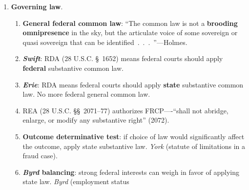 \begin{enumerate}
\begin{enumerate}
\begin{enumerate}
\begin{enumerate}
                (scope), 1391 (venue generally), 1404 (transfer), 1406 
                (dealing with improper venue). 
                \item Waivable.
                \item Transfer is available between districts.
            \end{enumerate}
            \item \textbf{\emph{Forum non conveniens}}.
            \begin{enumerate}
                \item Is there a more convenient forum where the case should 
                be adjudicated?
                \item Differences in substantive law are insufficient for FNC 
                unless the law in the target forum is egregiously bad.
                \item Successful FNC motions result in dismissal. \emph{Piper} 
                (plane crash in Scotland).
            \end{enumerate}
        \end{enumerate}
    \end{enumerate}
    \item \textbf{Governing law}.
    \begin{enumerate}
        \item \textbf{General federal common law}: ``The common law is not a 
        \textbf{brooding omnipresence} in the sky, but the articulate voice of 
        some sovereign or quasi sovereign that can be 
        identified~.~.~.~''---Holmes.
        \item \textbf{\emph{Swift}}: RDA (28 U.S.C. \S\ 1652) means federal 
        courts should apply \textbf{federal} substantive common law.
        \item \textbf{\emph{Erie}}: RDA means federal courts should apply 
        \textbf{state} substantive common law. No more federal general common 
        law.
        \item REA (28 U.S.C. \S\S\ 2071--77) authorizes FRCP----``shall not 
        abridge, enlarge, or modify any substantive right'' (2072).
        \item \textbf{Outcome determinative test}: if choice of law would 
        significantly affect the outcome, apply state substantive law. 
        \emph{York} (statute of limitations in a fraud case).
        \item \textbf{\emph{Byrd} balancing}: strong federal interests can 
        weigh in favor of applying state law. \emph{Byrd} (employment status 

\end{enumerate}
\end{enumerate}
